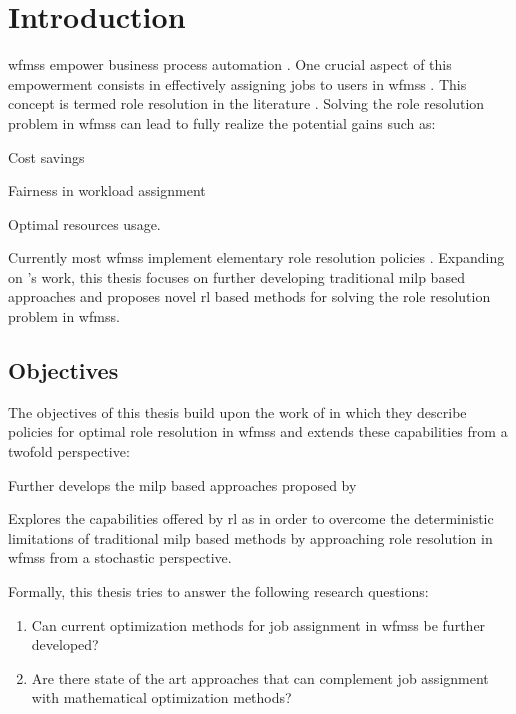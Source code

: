 \chapter{Introduction}
\label{ch:intro}

\glspl{wfms} empower business process automation \citep{Zeng2005}. One crucial aspect of this empowerment consists in effectively assigning jobs to users in \glspl{wfms} \citep{Zeng2005}. This concept is termed role resolution in the literature \citep{Cheng2000}. Solving the role resolution problem in \glspl{wfms} can lead to fully realize the potential gains such as:
\begin{enumerate*}
	\item Cost savings
	\item Fairness in workload assignment
	\item Optimal resources usage.
\end{enumerate*}

Currently most \glspl{wfms} implement elementary role resolution policies \citep{Zeng2005}. Expanding on \citet{Zeng2005}'s work, this thesis focuses on further developing traditional \gls{milp} based approaches and proposes novel \gls{rl} based methods for solving the role resolution problem in \glspl{wfms}.


\section{Objectives}
\label{sec:objectives}

The objectives of this thesis build upon the work of \citet{Zeng2005} in which they describe policies for optimal role resolution in \glspl{wfms} and extends these capabilities from a twofold perspective:
\begin{enumerate*}
	\item Further develops the \gls{milp} based approaches proposed by \citet{Zeng2005}
	\item Explores the capabilities offered by \gls{rl} as in order to overcome the deterministic limitations of traditional \gls{milp} based methods by approaching role resolution in \glspl{wfms} from a stochastic perspective.
\end{enumerate*}

Formally, this thesis tries to answer the following research questions:

\begin{enumerate}[label=\textbf{Q. \Roman*},ref=Research Question \Roman*]
\item Can current optimization methods for job assignment in \glspl{wfms} be further developed? \label{rq:one}
\item Are there state of the art approaches that can complement job assignment with mathematical optimization methods? \label{rq:two}
\end{enumerate}

